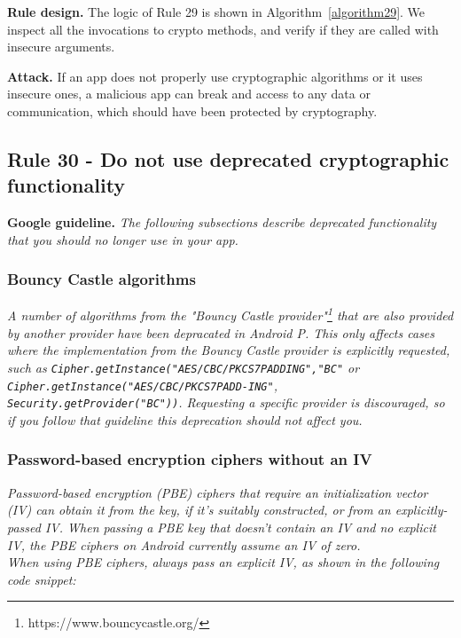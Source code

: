 \textbf{Rule design.} The logic of Rule 29 is shown in Algorithm~\ref{algorithm29}. We inspect all the invocations to crypto methods, and verify if they are called with insecure arguments.

\setcounter{algocf}{28}
\begin{algorithm}[]
\SetAlgoLined
{}
\caption{}
\label{algorithm29}
\end{algorithm}

\textbf{Attack.} If an app does not properly use cryptographic algorithms or it uses insecure ones, a malicious app can break and access to any data or communication, which should have been protected by cryptography. 
\subsection{Rule 30 - Do not use deprecated cryptographic functionality}
\textbf{Google guideline.} \emph{The following subsections describe deprecated functionality that you should no longer use in your app.}

\subsubsection{Bouncy Castle algorithms}
\emph{A number of algorithms from the "Bouncy Castle provider"\footnote{https://www.bouncycastle.org/} that are also provided by another provider have been depracated in Android P. This only affects cases where the implementation from the Bouncy Castle provider is explicitly requested, such as \texttt{Cipher.getInstance("AES/CBC/PKCS7PADDING",\allowbreak "BC"} or \texttt{Cipher.getInstance("AES/CBC/PKCS7PADD-\allowbreak ING"}, \texttt{Security.getProvider("BC"))}. Requesting a specific provider is discouraged, so if you follow that guideline this deprecation should not affect you. }

\subsubsection{Password-based encryption ciphers without an IV}
\emph{Password-based encryption (PBE) ciphers that require an initialization vector (IV) can obtain it from the key, if it's suitably constructed, or from an explicitly-passed IV. When passing a PBE key that doesn't contain an IV and no explicit IV, the PBE ciphers on Android currently assume an IV of zero.
\\
When using PBE ciphers, always pass an explicit IV, as shown in the following code snippet:}

